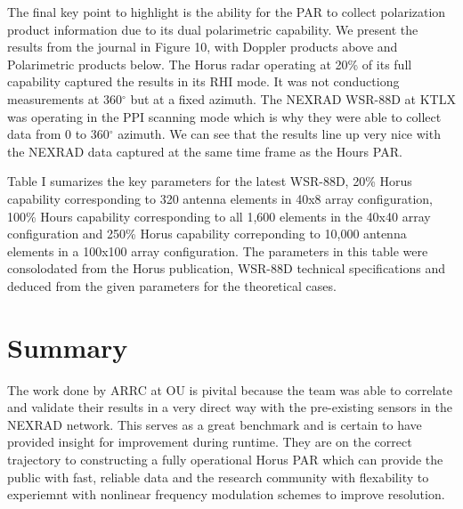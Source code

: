 \documentclass[conference]{IEEEtran}
\begin{document}
\par The final key point to highlight is the ability for the PAR to collect polarization product information due to its dual polarimetric capability. We present the results from the journal in Figure 10, with Doppler products above and Polarimetric products below. The Horus radar operating at 20\% of its full capability captured the results in its RHI mode. It was not conductiong measurements at 360$^\circ$ but at a fixed azimuth. The NEXRAD WSR-88D at KTLX was operating in the PPI scanning mode which is why they were able to collect data from 0 to 360$^\circ$ azimuth. We can see that the results line up very nice with the NEXRAD data captured at the same time frame as the Hours PAR. 
\par Table I sumarizes the key parameters for the latest WSR-88D, 20\% Horus capability corresponding to 320 antenna elements in 40x8 array configuration, 100\%  Hours capability corresponding to all 1,600 elements in the 40x40 array configuration and 250\% Horus capability correponding to 10,000 antenna elements in a 100x100 array configuration. The parameters in this table were consolodated from the Horus publication\cite{b1}, WSR-88D technical specifications\cite{b4} and deduced from the given parameters for the theoretical cases. 

\section{Summary}
\par The work done by ARRC at OU is pivital because the team was able to correlate and validate their results in a very direct way with the pre-existing sensors in the NEXRAD network. This serves as a great benchmark and is certain to have provided insight for improvement during runtime. They are on the correct trajectory to constructing a fully operational Horus PAR which can provide the public with fast, reliable data and the research community with flexability to experiemnt with nonlinear frequency modulation schemes to improve resolution.
\end{document}

